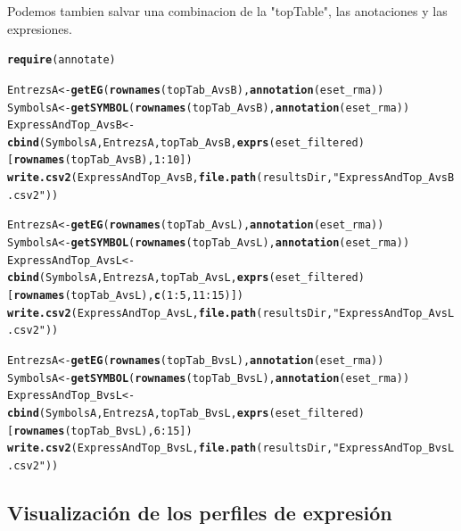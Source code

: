 \documentclass[a4paper]{article}\usepackage[]{graphicx}\usepackage[]{color}
\makeatletter
\newcommand{\hlnum}[1]{\textcolor[rgb]{0.686,0.059,0.569}{#1}}%
\newcommand{\hlstr}[1]{\textcolor[rgb]{0.192,0.494,0.8}{#1}}%
\newcommand{\hlopt}[1]{\textcolor[rgb]{0,0,0}{#1}}%
\newcommand{\hlstd}[1]{\textcolor[rgb]{0.345,0.345,0.345}{#1}}%
\newcommand{\hlkwb}[1]{\textcolor[rgb]{0.69,0.353,0.396}{#1}}%
\newcommand{\hlkwd}[1]{\textcolor[rgb]{0.737,0.353,0.396}{\textbf{#1}}}%
\newenvironment{kframe}{%
 \def\at@end@of@kframe{}%
 \ifinner\ifhmode%
  \def\at@end@of@kframe{\end{minipage}}%
  \begin{minipage}{\columnwidth}%
 \fi\fi%
 \def\FrameCommand##1{\hskip\@totalleftmargin \hskip-\fboxsep
 \colorbox{shadecolor}{##1}\hskip-\fboxsep
     \hskip-\linewidth \hskip-\@totalleftmargin \hskip\columnwidth}%
 \MakeFramed {\advance\hsize-\width
   \@totalleftmargin\z@ \linewidth\hsize
   \@setminipage}}%
 {\par\unskip\endMakeFramed%
 \at@end@of@kframe}
\newenvironment{knitrout}{}{} %
\makeatother
\begin{document}
Podemos tambien salvar una combinacion de la "topTable", las anotaciones y las expresiones.
\begin{knitrout}
\color{fgcolor}\begin{kframe}
\begin{alltt}
\hlkwd{require}\hlstd{(annotate)}

\hlstd{EntrezsA} \hlkwb{<-} \hlkwd{getEG} \hlstd{(}\hlkwd{rownames}\hlstd{(topTab_AvsB),} \hlkwd{annotation}\hlstd{(eset_rma))}
\hlstd{SymbolsA} \hlkwb{<-} \hlkwd{getSYMBOL} \hlstd{(}\hlkwd{rownames}\hlstd{(topTab_AvsB),} \hlkwd{annotation}\hlstd{(eset_rma))}
\hlstd{ExpressAndTop_AvsB} \hlkwb{<-} \hlkwd{cbind}\hlstd{(SymbolsA, EntrezsA, topTab_AvsB,} \hlkwd{exprs}\hlstd{(eset_filtered)[}\hlkwd{rownames}\hlstd{(topTab_AvsB),} \hlnum{1}\hlopt{:}\hlnum{10}\hlstd{])}
\hlkwd{write.csv2}\hlstd{(ExpressAndTop_AvsB,} \hlkwd{file.path}\hlstd{(resultsDir,} \hlstr{"ExpressAndTop_AvsB.csv2"}\hlstd{))}

\hlstd{EntrezsA} \hlkwb{<-} \hlkwd{getEG} \hlstd{(}\hlkwd{rownames}\hlstd{(topTab_AvsL),} \hlkwd{annotation}\hlstd{(eset_rma))}
\hlstd{SymbolsA} \hlkwb{<-} \hlkwd{getSYMBOL} \hlstd{(}\hlkwd{rownames}\hlstd{(topTab_AvsL),} \hlkwd{annotation}\hlstd{(eset_rma))}
\hlstd{ExpressAndTop_AvsL} \hlkwb{<-} \hlkwd{cbind}\hlstd{(SymbolsA, EntrezsA, topTab_AvsL,} \hlkwd{exprs}\hlstd{(eset_filtered)[}\hlkwd{rownames}\hlstd{(topTab_AvsL),} \hlkwd{c}\hlstd{(}\hlnum{1}\hlopt{:}\hlnum{5}\hlstd{,}\hlnum{11}\hlopt{:}\hlnum{15}\hlstd{)])}
\hlkwd{write.csv2}\hlstd{(ExpressAndTop_AvsL,} \hlkwd{file.path}\hlstd{(resultsDir,} \hlstr{"ExpressAndTop_AvsL.csv2"}\hlstd{))}

\hlstd{EntrezsA} \hlkwb{<-} \hlkwd{getEG} \hlstd{(}\hlkwd{rownames}\hlstd{(topTab_BvsL),} \hlkwd{annotation}\hlstd{(eset_rma))}
\hlstd{SymbolsA} \hlkwb{<-} \hlkwd{getSYMBOL} \hlstd{(}\hlkwd{rownames}\hlstd{(topTab_BvsL),} \hlkwd{annotation}\hlstd{(eset_rma))}
\hlstd{ExpressAndTop_BvsL} \hlkwb{<-} \hlkwd{cbind}\hlstd{(SymbolsA, EntrezsA, topTab_BvsL,} \hlkwd{exprs}\hlstd{(eset_filtered)[}\hlkwd{rownames}\hlstd{(topTab_BvsL),} \hlnum{6}\hlopt{:}\hlnum{15}\hlstd{])}
\hlkwd{write.csv2}\hlstd{(ExpressAndTop_BvsL,} \hlkwd{file.path}\hlstd{(resultsDir,} \hlstr{"ExpressAndTop_BvsL.csv2"}\hlstd{))}
\end{alltt}
\end{kframe}
\end{knitrout}

\subsection{Visualización de los perfiles de expresión}
\end{document}
